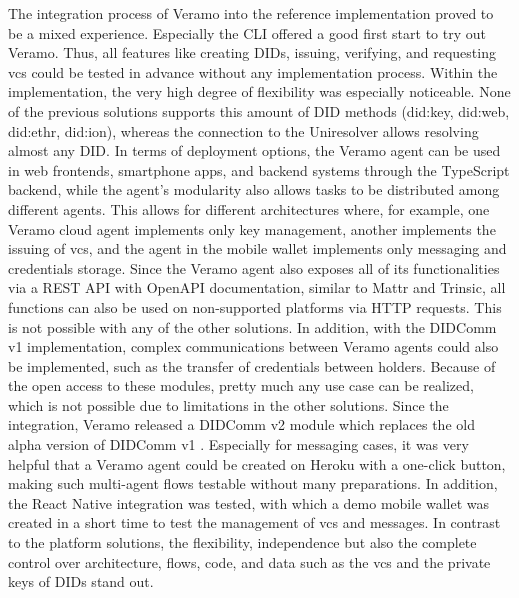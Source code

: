         The integration process of Veramo into the reference implementation proved to be a mixed experience. Especially the \ac{CLI} offered a good first start to try out Veramo. Thus, all features like creating \acp{DID}, issuing, verifying, and requesting \acp{vc} could be tested in advance without any implementation process. Within the implementation, the very high degree of flexibility was especially noticeable. None of the previous solutions supports this amount of \ac{DID} methods (did:key, did:web, did:ethr, did:ion), whereas the connection to the Uniresolver allows resolving almost any \ac{DID}. In terms of deployment options, the Veramo agent can be used in web frontends, smartphone apps, and backend systems through the TypeScript backend, while the agent's modularity also allows tasks to be distributed among different agents. This allows for different architectures where, for example, one Veramo cloud agent implements only key management, another implements the issuing of \acp{vc}, and the agent in the mobile wallet implements only messaging and credentials storage. Since the Veramo agent also exposes all of its functionalities via a REST API with OpenAPI documentation, similar to Mattr and Trinsic, all functions can also be used on non-supported platforms via HTTP requests. This is not possible with any of the other solutions. In addition, with the DIDComm v1 implementation, complex communications between Veramo agents could also be implemented, such as the transfer of credentials between holders. Because of the open access to these modules, pretty much any use case can be realized, which is not possible due to limitations in the other solutions. Since the integration, Veramo released a DIDComm v2 module which replaces the old alpha version of DIDComm v1 \cite{veramo_blog_2021}.
        Especially for messaging cases, it was very helpful that a Veramo agent could be created on Heroku with a one-click button, making such multi-agent flows testable without many preparations. In addition, the React Native integration was tested, with which a demo mobile wallet was created in a short time to test the management of \acp{vc} and messages. 
        In contrast to the platform solutions, the flexibility, independence but also the complete control over architecture, flows, code, and data such as the \acp{vc} and the private keys of \acp{DID} stand out. 
    
